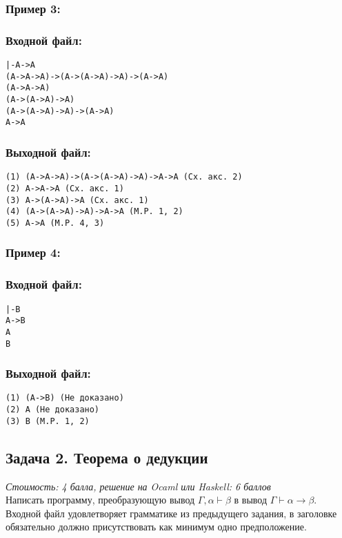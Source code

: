 \documentclass[11pt,a4paper,oneside]{article}
\begin{document}
\subsubsection*{Пример 3:}
\begin{minipage}[t]{.5\textwidth}
\subsubsection*{Входной файл:}
\begin{verbatim}
|-A->A
(A->A->A)->(A->(A->A)->A)->(A->A)
(A->A->A)
(A->(A->A)->A)
(A->(A->A)->A)->(A->A)
A->A
\end{verbatim}
\end{minipage}
\begin{minipage}[t]{.5\textwidth}
\subsubsection*{Выходной файл:}
\begin{verbatim}
(1) (A->A->A)->(A->(A->A)->A)->A->A (Сх. акс. 2)
(2) A->A->A (Сх. акс. 1)
(3) A->(A->A)->A (Сх. акс. 1)
(4) (A->(A->A)->A)->A->A (M.P. 1, 2)
(5) A->A (M.P. 4, 3)
\end{verbatim}
\end{minipage}

\subsubsection*{Пример 4:}
\begin{minipage}[t]{.5\textwidth}
\subsubsection*{Входной файл:}
\begin{verbatim}
|-B
A->B
A
B
\end{verbatim}
\end{minipage}
\begin{minipage}[t]{.5\textwidth}
\subsubsection*{Выходной файл:}
\begin{verbatim}
(1) (A->B) (Не доказано)
(2) A (Не доказано)
(3) B (M.P. 1, 2)
\end{verbatim}
\end{minipage}

\subsection*{Задача 2. Теорема о дедукции}
{\it Стоимость: 4 балла, решение на Ocaml или Haskell: 6 баллов }\vspace{2mm}\\
Написать программу, преобразующую вывод $\Gamma, \alpha \vdash \beta$ в вывод
$\Gamma \vdash \alpha \rightarrow \beta$.
Входной файл удовлетворяет грамматике из предыдущего задания,
в заголовке обязательно должно присутствовать как минимум одно предположение.
\end{document}
